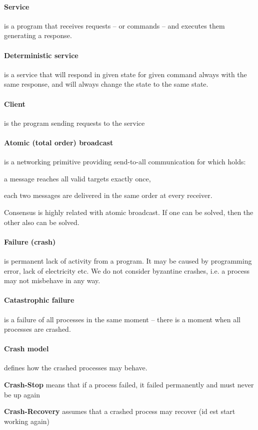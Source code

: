 \paragraph{Service}
is a program that receives requests -- or commands -- and executes them generating a response.

\paragraph{Deterministic service}
is a service that will respond in given state for given command always with the same response, and will always change the state to the same state.

\paragraph{Client}
is the program sending requests to the service

\paragraph{Atomic (total order) broadcast}
is a networking primitive providing send-to-all communication for which holds:
\begin{tightList}
 \item[\textbullet] a message reaches all valid targets exactly once,
 \item[\textbullet] each two messages are delivered in the same order at every receiver.
\end{tightList}

\noindent Consensus is highly related with atomic broadcast. If one can be solved, then the other also can be solved.

\paragraph{Failure (crash)}
is permanent lack of activity from a program. It may be caused by programming error, lack of electricity etc.
We do not consider byzantine crashes, i.e. a process may not misbehave in any way.

\paragraph{Catastrophic failure} is a failure of all processes in the same moment -- there is a moment when all processes are crashed.

\paragraph{Crash model}
defines how the crashed processes may behave.
\begin{tightList}[ \setlength{\leftmargin}{2\leftmargin}]
 \item[\textbf{Crash-Stop}] means that if a process failed, it failed permanently and must never be up again
 \item[\textbf{Crash-Recovery}] assumes that a crashed process may recover (id est start working again)
\end{tightList}

